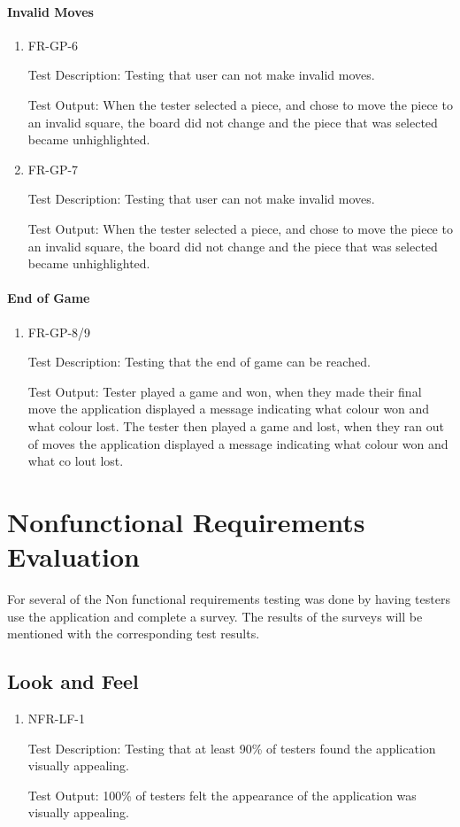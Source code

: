 \documentclass[12pt, titlepage]{article}
\begin{document}
\paragraph{Invalid Moves}
\begin{enumerate}
    \item{FR-GP-6}
    
    Test Description: Testing that user can not make invalid moves.
    
    Test Output: When the tester selected a piece, and chose to move the piece to an invalid square, the board did not change and the piece that was selected became unhighlighted.
    \item{FR-GP-7}
    
    Test Description: Testing that user can not make invalid moves.
    
    Test Output: When the tester selected a piece, and chose to move the piece to an invalid square, the board did not change and the piece that was selected became unhighlighted.
\end{enumerate}

\paragraph{End of Game}
\begin{enumerate}
    \item{FR-GP-8/9}
    
    Test Description: Testing that the end of game can be reached.
    
    Test Output: Tester played a game and won, when they made their final move the application displayed a message indicating what colour won and what colour lost. The tester then played a game and lost, when they ran out of moves the application displayed a message indicating what colour won and what co lout lost.
\end{enumerate}

\section{Nonfunctional Requirements Evaluation}
For several of the Non functional requirements testing was done by having testers use the application and complete a survey. The results of the surveys will be mentioned with the corresponding test results.

\subsection{Look and Feel}
\begin{enumerate}
    \item {NFR-LF-1}

    Test Description: Testing that at least 90\% of testers found the application visually appealing.
    
    Test Output: 100\% of testers felt the appearance of the application was visually appealing.
\end{enumerate}
\end{document}
